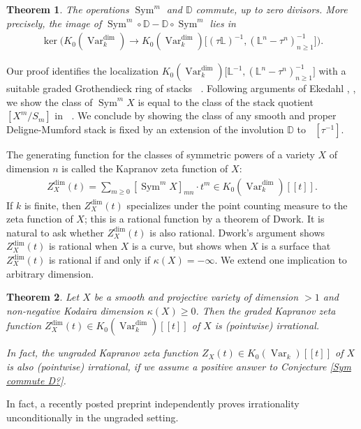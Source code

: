 \documentclass{amsart}
\newtheorem{thm}{Theorem}[section]
\theoremstyle{definition}
\DeclareMathOperator{\Sym}{Sym}
\DeclareMathOperator{\Var}{Var}
\DeclareMathOperator{\Stk}{Stk}
\newcommand{\Kdim}{K_0(\Var_k^{\dim})}
\DeclareMathOperator{\Kstk}{K_0(\Stk_k^{\dim})}
\numberwithin{equation}{section}
\begin{document}
\begin{thm}\label{Sym commute D torsion}
The operations $\Sym^m$ and $\mathbb{D}$ commute, up to zero divisors. More precisely, the image of $\Sym^m \circ \mathbb{D} - \mathbb{D} \circ \Sym^m$ lies in
\begin{align*}
    \ker \bigg( \Kdim \rightarrow \Kdim \big[ (\tau \mathbb{L})^{-1}, (\mathbb{L}^n-\tau^n)^{-1}_{n \geq 1} \big] \bigg).
\end{align*}
\end{thm}

Our proof identifies the localization $\Kdim \big[ \mathbb{L}^{-1}, (\mathbb{L}^n-\tau^n)^{-1}_{n \geq 1} \big]$ with a suitable graded Grothendieck ring of stacks $\Kstk$. Following arguments of Ekedahl \cite{ekedahlstacks}, \cite{ekedahlgroup}, we show the class of $\Sym^m X$ is equal to the class of the stack quotient $[X^m/S_m]$ in $\Kstk$. We conclude by showing the class of any smooth and proper Deligne-Mumford stack is fixed by an extension of the involution $\mathbb{D}$ to $\Kstk[\tau^{-1}]$. 

The generating function for the classes of symmetric powers of a variety $X$ of dimension $n$ is called the Kapranov zeta function of $X$:
\begin{align*}
    Z_X^{\dim}(t) = \sum_{m \geq 0} [\Sym^m X]_{mn} \cdot t^m \in \Kdim[[t]].
\end{align*}
If $k$ is finite, then $Z_X^{\dim}(t)$ specializes under the point counting measure to the zeta function of $X$; this is a rational function by a theorem of Dwork. It is natural to ask whether $Z_X^{\dim}(t)$ is also rational. Dwork's argument shows $Z_X^{\dim}(t)$ is rational when $X$ is a curve, but \cite{larsenluntsrationality} shows when $X$ is a surface that $Z_X^{\dim}(t)$ is rational if and only if $\kappa(X) = -\infty$. We extend one implication to arbitrary dimension.

\begin{thm}\label{intro Kapranov}
Let $X$ be a smooth and projective variety of dimension $>1$ and non-negative Kodaira dimension $\kappa(X) \geq 0$. Then the graded Kapranov zeta function $Z_X^{\dim}(t) \in K_0(\Var_k^{\dim})[[t]]$ of $X$ is (pointwise) irrational. 

In fact, the ungraded Kapranov zeta function $Z_X(t) \in K_0(\Var_k)[[t]]$ of $X$ is also (pointwise) irrational, if we assume a positive answer to Conjecture \ref{Sym commute D?}.
\end{thm}

In fact, a recently posted preprint \cite{shein} independently proves irrationality unconditionally in the ungraded setting.
\end{document}

